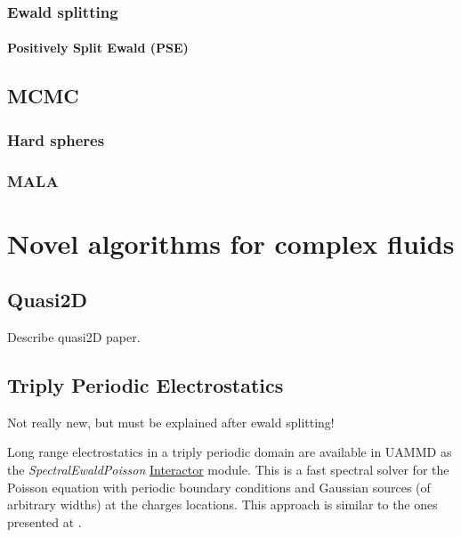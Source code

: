 \documentclass[ twoside,openright,titlepage,numbers=noenddot,%
headinclude,footinclude,cleardoublepage=empty,abstract=on,
BCOR=5mm,paper=a4,fontsize=11pt, dvipsnames
]{scrreprt}
\newcommand{\red}[1]{{\color{red}#1}}
\begin{document}

\section{Ewald splitting}


\subsection{Positively Split Ewald (PSE)}


\chapter{MCMC}

\section{Hard spheres}

\section{MALA}



\cleardoublepage
\part{Novel algorithms for complex fluids}\label{pt:algo}


\chapter{Quasi2D}

Describe quasi2D paper.


\chapter{Triply Periodic Electrostatics} \label{ch:tppoisson}
\red{Not really new, but must be explained after ewald splitting!}

Long range electrostatics in a triply periodic domain are available in \gls{UAMMD} as the \emph{SpectralEwaldPoisson} \hyperref[sec:interactor]{Interactor} module.  
This is a fast spectral solver for the Poisson equation with periodic boundary conditions and Gaussian sources (of arbitrary widths) at the charges locations. This approach is similar to the ones presented at \cite{sepois1,sepois2, sepois3}.
\end{document}
